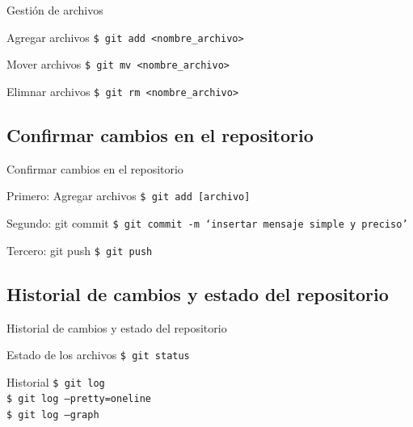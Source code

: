 \documentclass{beamer}
\begin{document}
\begin{frame} {Gestión de archivos}

  \begin{block}{Agregar archivos }
    {\texttt{\$ git add <nombre\_archivo> }}
  \end{block}

  \begin{block}{Mover archivos}
    \texttt{\$ git mv <nombre\_archivo>}
  \end{block}

  \begin{block}{Elimnar archivos}
    \texttt{\$ git rm <nombre\_archivo>}
  \end{block}

\end{frame}


\subsection {Confirmar cambios en el repositorio}

  \begin{frame} {Confirmar cambios en el repositorio}

    \begin{block}{Primero: Agregar archivos }
      {\texttt{\$ git add [archivo] }}
    \end{block}

    \begin{block}{Segundo: git commit}
      {\texttt{\$ git commit -m `insertar mensaje simple y preciso' }}
    \end{block}

    \begin{block}{Tercero: git push}
      {\texttt{\$ git push}}
    \end{block}

  \end{frame}


  \subsection {Historial de cambios y estado del repositorio}

  \begin{frame} {\LARGE Historial de cambios y estado del repositorio}
    
    \begin{block}{Estado de los archivos}
      {\texttt{\$ git status}} 
    \end{block}

    \begin{block}{Historial}
      {\texttt{\$ git log}} \\
      \texttt{\$ git log --pretty=oneline} \\
      \texttt{\$ git log --graph} \\ 
    \end{block}


  \end{frame}
\end{document}
